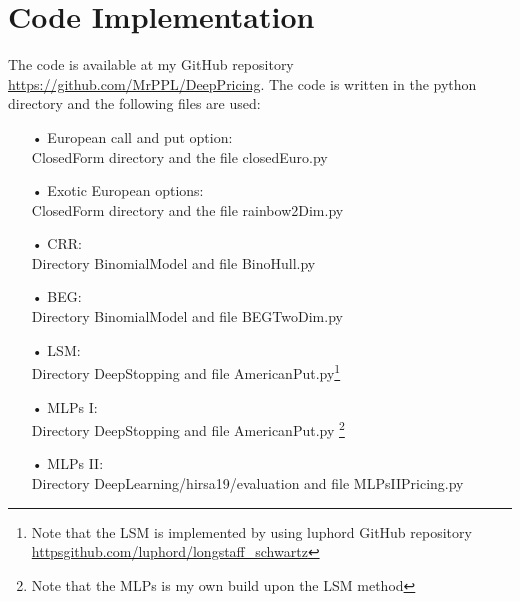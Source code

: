 \chapter{Code Implementation} %

\label{AppendixB} %

The code is available at my GitHub repository \href{https://github.com/MrPPL/DeepPricing}{https://github.com/MrPPL/DeepPricing}. The code is written in the python directory and the following files are used:
\begin{enumerate}
\item[•] European call and put option:\\
ClosedForm directory and the file closedEuro.py
\item[•] Exotic European options:\\
ClosedForm directory and the file rainbow2Dim.py
\item[•] CRR:\\
Directory BinomialModel and file BinoHull.py
\item[•] BEG:\\
Directory BinomialModel and file BEGTwoDim.py
\item[•] LSM:\\
Directory DeepStopping and file AmericanPut.py\footnote{Note that the LSM is implemented by using luphord GitHub repository \href{https://github.com/luphord/longstaff_schwartz}{https\:\/\/github.com/luphord/longstaff\_schwartz}}
\item[•] MLPs I:\\
Directory DeepStopping and file AmericanPut.py \footnote{Note that the MLPs is my own build upon the LSM method}
\item[•] MLPs II:\\
Directory DeepLearning/hirsa19/evaluation and file MLPsIIPricing.py
\end{enumerate}